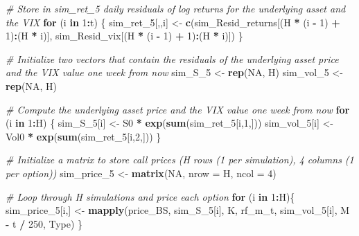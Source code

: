 \documentclass[]{article}
\newenvironment{Shaded}{\begin{snugshade}}{\end{snugshade}}
\newcommand{\CommentTok}[1]{\textcolor[rgb]{0.56,0.35,0.01}{\textit{#1}}}
\newcommand{\ControlFlowTok}[1]{\textcolor[rgb]{0.13,0.29,0.53}{\textbf{#1}}}
\newcommand{\DataTypeTok}[1]{\textcolor[rgb]{0.13,0.29,0.53}{#1}}
\newcommand{\DecValTok}[1]{\textcolor[rgb]{0.00,0.00,0.81}{#1}}
\newcommand{\KeywordTok}[1]{\textcolor[rgb]{0.13,0.29,0.53}{\textbf{#1}}}
\newcommand{\NormalTok}[1]{#1}
\newcommand{\OperatorTok}[1]{\textcolor[rgb]{0.81,0.36,0.00}{\textbf{#1}}}
\newcommand{\OtherTok}[1]{\textcolor[rgb]{0.56,0.35,0.01}{#1}}
\newcommand{\StringTok}[1]{\textcolor[rgb]{0.31,0.60,0.02}{#1}}
\begin{document}
\begin{Shaded}
\begin{Highlighting}[]
\CommentTok{\# Store in \textquotesingle{}sim\_ret\_5\textquotesingle{} daily residuals of log returns for the underlying asset and the VIX}
\ControlFlowTok{for}\NormalTok{ (i }\ControlFlowTok{in} \DecValTok{1}\OperatorTok{:}\NormalTok{t) \{}
\NormalTok{  sim\_ret\_}\DecValTok{5}\NormalTok{[,,i] <{-}}\StringTok{ }\KeywordTok{c}\NormalTok{(sim\_Resid\_returns[(H }\OperatorTok{*}\StringTok{ }\NormalTok{(i }\OperatorTok{{-}}\StringTok{ }\DecValTok{1}\NormalTok{) }\OperatorTok{+}\StringTok{ }\DecValTok{1}\NormalTok{)}\OperatorTok{:}\NormalTok{(H }\OperatorTok{*}\StringTok{ }\NormalTok{i)], sim\_Resid\_vix[(H }\OperatorTok{*}\StringTok{ }\NormalTok{(i }\OperatorTok{{-}}\StringTok{ }\DecValTok{1}\NormalTok{) }\OperatorTok{+}\StringTok{ }\DecValTok{1}\NormalTok{)}\OperatorTok{:}\NormalTok{(H }\OperatorTok{*}\StringTok{ }\NormalTok{i)])}
\NormalTok{\}}

\CommentTok{\# Initialize two vectors that contain the residuals of the underlying asset price and the VIX value one week from now}
\NormalTok{sim\_S\_}\DecValTok{5}\NormalTok{   <{-}}\StringTok{ }\KeywordTok{rep}\NormalTok{(}\OtherTok{NA}\NormalTok{, H)}
\NormalTok{sim\_vol\_}\DecValTok{5}\NormalTok{ <{-}}\StringTok{ }\KeywordTok{rep}\NormalTok{(}\OtherTok{NA}\NormalTok{, H)}

\CommentTok{\# Compute the underlying asset price and the VIX value one week from now}
\ControlFlowTok{for}\NormalTok{ (i }\ControlFlowTok{in} \DecValTok{1}\OperatorTok{:}\NormalTok{H) \{}
\NormalTok{  sim\_S\_}\DecValTok{5}\NormalTok{[i]   <{-}}\StringTok{ }\NormalTok{S0 }\OperatorTok{*}\StringTok{ }\KeywordTok{exp}\NormalTok{(}\KeywordTok{sum}\NormalTok{(sim\_ret\_}\DecValTok{5}\NormalTok{[i,}\DecValTok{1}\NormalTok{,]))}
\NormalTok{  sim\_vol\_}\DecValTok{5}\NormalTok{[i] <{-}}\StringTok{ }\NormalTok{Vol0 }\OperatorTok{*}\StringTok{ }\KeywordTok{exp}\NormalTok{(}\KeywordTok{sum}\NormalTok{(sim\_ret\_}\DecValTok{5}\NormalTok{[i,}\DecValTok{2}\NormalTok{,]))}
\NormalTok{\}}

\CommentTok{\# Initialize a matrix to store call prices (H rows (1 per simulation), 4 columns (1 per option))}
\NormalTok{sim\_price\_}\DecValTok{5}\NormalTok{ <{-}}\StringTok{ }\KeywordTok{matrix}\NormalTok{(}\OtherTok{NA}\NormalTok{, }\DataTypeTok{nrow =}\NormalTok{ H, }\DataTypeTok{ncol =} \DecValTok{4}\NormalTok{)}

\CommentTok{\# Loop through H simulations and price each option}
\ControlFlowTok{for}\NormalTok{ (i }\ControlFlowTok{in} \DecValTok{1}\OperatorTok{:}\NormalTok{H)\{}
\NormalTok{  sim\_price\_}\DecValTok{5}\NormalTok{[i,] <{-}}\StringTok{ }\KeywordTok{mapply}\NormalTok{(price\_BS, sim\_S\_}\DecValTok{5}\NormalTok{[i], K, rf\_m\_t, sim\_vol\_}\DecValTok{5}\NormalTok{[i], M }\OperatorTok{{-}}\StringTok{ }\NormalTok{t }\OperatorTok{/}\StringTok{ }\DecValTok{250}\NormalTok{, Type)}
\NormalTok{\}}
\end{Highlighting}
\end{Shaded}
\end{document}
